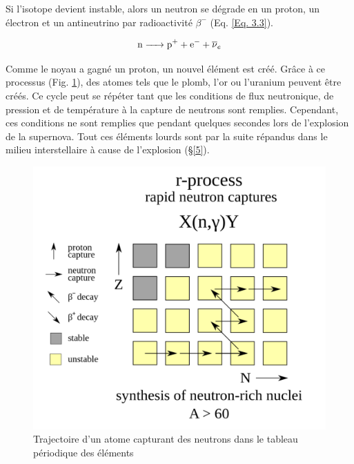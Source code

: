  Si l'isotope devient instable, alors un neutron se dégrade en un proton, un électron et un antineutrino  par radioactivité $\beta^{-}$ (Eq. \ref{Eq. 3.3}).
 
\begin{equation} \ce{n -> \ce{p+} + \ce{e-} + $\overline{\nu}$_{e}}\label{Eq. 3.3} \end{equation}\smallskip
 
 Comme le noyau a gagné un proton, un nouvel élément est créé. Grâce à ce processus (Fig. \ref{Fig. 3.3}), des atomes tels que le plomb, l'or ou l'uranium peuvent être créés. Ce cycle peut se répéter tant que les conditions de flux neutronique, de pression et de température à la capture de neutrons sont remplies. Cependant, ces conditions ne sont remplies que pendant quelques secondes lors de l'explosion de la supernova. Tout ces éléments lourds sont par la suite répandus dans le milieu interstellaire à cause de l'explosion (§\ref{5}).
 
 \begin{figure}[H]
 	\centering
 	\includegraphics[scale=0.16]{images/processusr}
 	\caption[Trajectoire d'un atome capturant des neutrons dans le tableau périodique des éléments\newline \url{https://it.wikipedia.org/w/index.php?title=Processo_r&oldid=103197986}]{Trajectoire d'un atome capturant des neutrons dans le tableau périodique des éléments}
 	\label{Fig. 3.3}
 \end{figure} 

 \vfill



 
 
